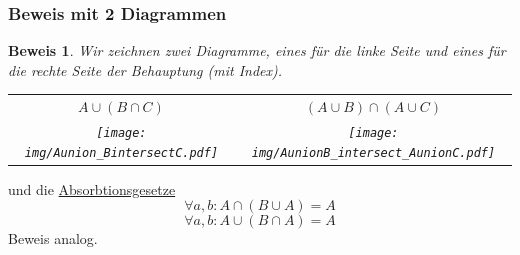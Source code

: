 \documentclass{report}
\newtheorem{myproof}{Beweis}
\begin{document}
\subsubsection{Beweis mit 2 Diagrammen}
\begin{myproof}Wir zeichnen zwei Diagramme, eines für die linke Seite und eines für die rechte Seite der Behauptung (mit Index).
\begin{center}
\begin{tabular}{c c}
$A \cup (B \cap C)$ & $(A \cup B) \cap (A \cup C)$\\
\texttt{[image: img/Aunion\_BintersectC.pdf]} & \texttt{[image: img/AunionB\_intersect\_AunionC.pdf]}
\end{tabular}
\end{center}
\end{myproof}
und die \underline{Absorbtionsgesetze}
\begin{equation}\forall a,b : A \cap (B \cup A) = A\end{equation}
\begin{equation}\forall a,b : A \cup (B \cap A) = A\end{equation}
Beweis analog.
\end{document}
